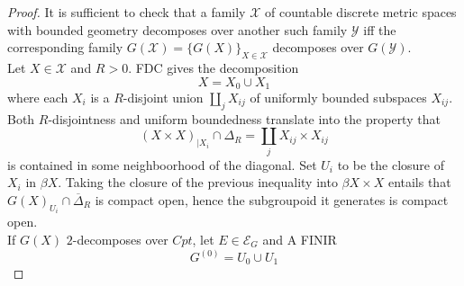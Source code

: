 \begin{proof}
It is sufficient to check that a family $\mathcal X$ of countable discrete metric spaces with bounded geometry decomposes over another such family $\mathcal Y$ iff the corresponding family $G(\mathcal X) = \{G(X)\}_{X\in \mathcal X}$ decomposes over $G(\mathcal Y)$.\\

Let $X\in \mathcal X$ and $R>0$. FDC gives the decomposition \[X = X_0 \cup X_1\]
where each $X_i$ is a $R$-disjoint union $\coprod_j X_{ij}$ of uniformly bounded subspaces $X_{ij}$. Both $R$-disjointness and uniform boundedness translate into the property that
\[(X\times X)_{|X_i} \cap \Delta_R =\coprod_j X_{ij} \times X_{ij}  \]   
is contained in some neighboorhood of the diagonal. Set $U_i$ to be the closure of $X_i$ in $\beta X$. Taking the closure of the previous inequality into $\beta X\times X$ entails that $G(X)_{U_i} \cap \overline \Delta_R$ is compact open, hence the subgroupoid it generates is compact open.\\

If $G(X)$ $2$-decomposes over $Cpt$, let $E\in \mathcal E_G$ and A FINIR
\[G^{(0)} = U_0 \cup U_1\] \end{proof}






























